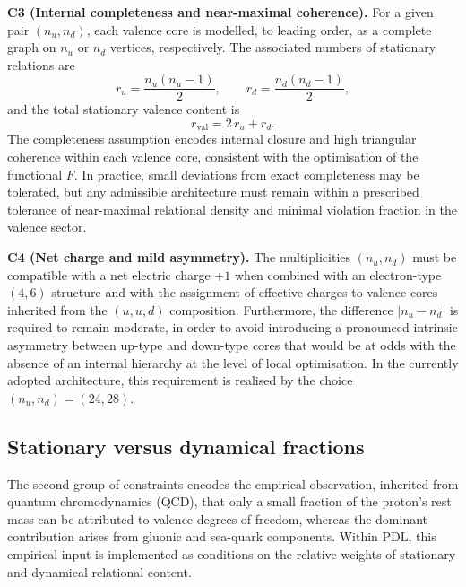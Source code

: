 \documentclass[11pt,a4paper]{article}
\begin{document}
\medskip
\noindent\textbf{C3 (Internal completeness and near-maximal coherence).} For a given pair $(n_u,n_d)$, each valence core is modelled, to leading order, as a complete graph on $n_u$ or $n_d$ vertices, respectively. The associated numbers of stationary relations are
\begin{equation}
r_u = \frac{n_u(n_u-1)}{2},\qquad r_d = \frac{n_d(n_d-1)}{2},
\end{equation}
and the total stationary valence content is
\begin{equation}
r_{\mathrm{val}} = 2\,r_u + r_d.
\end{equation}
The completeness assumption encodes internal closure and high triangular coherence within each valence core, consistent with the optimisation of the functional $F$.\cite{LaubscherPDLFull2026,LaubscherLDP2026} In practice, small deviations from exact completeness may be tolerated, but any admissible architecture must remain within a prescribed tolerance of near-maximal relational density and minimal violation fraction in the valence sector.

\medskip
\noindent\textbf{C4 (Net charge and mild asymmetry).} The multiplicities $(n_u,n_d)$ must be compatible with a net electric charge $+1$ when combined with an electron-type $(4,6)$ structure and with the assignment of effective charges to valence cores inherited from the $(u,u,d)$ composition. Furthermore, the difference $|n_u-n_d|$ is required to remain moderate, in order to avoid introducing a pronounced intrinsic asymmetry between up-type and down-type cores that would be at odds with the absence of an internal hierarchy at the level of local optimisation.\cite{LaubscherLDP2026,LaubscherIMRadPDL2026} In the currently adopted architecture, this requirement is realised by the choice $(n_u,n_d)=(24,28)$.

\subsection{Stationary versus dynamical fractions}

The second group of constraints encodes the empirical observation, inherited from quantum chromodynamics (QCD), that only a small fraction of the proton’s rest mass can be attributed to valence degrees of freedom, whereas the dominant contribution arises from gluonic and sea-quark components.\cite{AmslerQCDProton} Within PDL, this empirical input is implemented as conditions on the relative weights of stationary and dynamical relational content.
\end{document}
